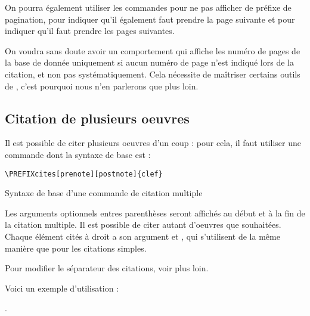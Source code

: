 On pourra également utiliser les commandes  pour ne pas afficher de préfixe de pagination,   pour indiquer qu'il également faut prendre la page suivante et  pour indiquer qu'il faut prendre les pages suivantes.

\begin{anedocte}
On voudra sans doute avoir un comportement qui affiche les numéro de pages de la base de donnée uniquement si aucun numéro de page n'est indiqué lors de la citation, et non pas systématiquement. Cela nécessite de maîtriser certains outils de , c'est pourquoi nous n'en parlerons que plus loin.
\end{anedocte}

\subsection{Citation de plusieurs oeuvres}

Il est possible de citer plusieurs oeuvres d'un coup : pour cela, il faut utiliser une commande dont la syntaxe de base est :

\begin{listing}[ht]
\begin{verbatim}
\PREFIXcites[prenote][postnote]{clef}
\end{verbatim}
\caption{Syntaxe de base d'une commande de citation multiple}
\end{listing}
Les arguments optionnels entres parenthèses seront affichés au début et à la fin de la citation multiple. Il est possible de citer autant d'oeuvres que souhaitées. Chaque élément cités à droit a son argument  et , qui s'utilisent de la même manière que pour les citations simples.

\begin{anedocte}
Pour modifier le séparateur des citations, voir plus loin.
\end{anedocte}

Voici un exemple d'utilisation : 

.

